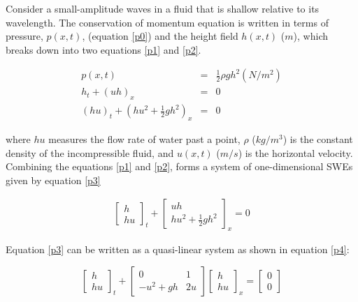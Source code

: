 \documentclass[12pt,a4paper]{article}
\begin{document}
	\noindent Consider a small-amplitude waves in a fluid that is shallow relative to its wavelength. The conservation of momentum equation is written in terms of pressure, $p(x,t)$, (equation \eqref{p0}) and the height field $h(x,t)$ ($m$), which breaks down into two equations \eqref{p1} and \eqref{p2}.

	\begin{eqnarray}
			p(x,t)& =& \frac{1}{2}\rho gh^{2} (N/m^{2}) 
		\label{p0}\\
		h_{t} + (uh)_x &=& 0
		\label{p1} \\
		(hu)_t + \left(hu^{2} + \frac{1}{2}gh^{2} \right)_x &=& 0
		\label{p2}
	\end{eqnarray}
	
	\noindent where $hu$ measures the flow rate of water past a point,  $\rho$ ($kg/m^3$) is the constant density of the incompressible fluid, and $u(x,t)$ ($m/s$) is the horizontal velocity.\\
	
	\noindent	Combining the equations \eqref{p1} and \eqref{p2}, forms a system of one-dimensional SWEs given by equation \eqref{p3}
	
	\begin{eqnarray}
		\begin{bmatrix} h \\ hu \end{bmatrix}_t + \begin{bmatrix} uh \\ hu^{2} + \frac{1}{2} gh^{2} \end{bmatrix}_x  = 0 
		\label{p3}
	\end{eqnarray}
	
	\noindent Equation \eqref{p3} can be written as a quasi-linear system as shown in equation \eqref{p4}:
	
	\begin{equation}
		\begin{bmatrix} h \\ hu \end{bmatrix}_t + 
		\begin{bmatrix} 0 &  1 \\ -u^{2} + gh & 2u \end{bmatrix} 
		\begin{bmatrix} h \\ hu \end{bmatrix}_x =  
		\begin{bmatrix} 0 \\ 0 \end{bmatrix}
		\label{p4}
	\end{equation}
	
\end{document}

